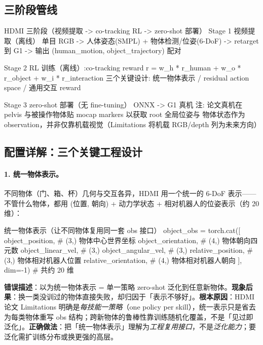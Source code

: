 \subsection{三阶段管线}
\label{sec:rlmc-mm-hdmi-pipeline}

\begin{codebox}{HDMI 三阶段（视频提取 -> co-tracking RL -> zero-shot 部署）}
Stage 1 视频提取（离线）
  单目 RGB -> 人体姿态(SMPL) + 物体检测/位姿(6-DoF) -> retarget 到 G1
  -> 输出 (human_motion, object_trajectory) 配对

Stage 2 RL 训练（离线）:co-tracking reward
  r = w_h * r_human + w_o * r_object + w_i * r_interaction
  三个关键设计: 统一物体表示 / residual action space / 通用交互 reward

Stage 3 zero-shot 部署（无 fine-tuning）
  ONNX -> G1 真机
  注: 论文真机在 pelvis 与被操作物体贴 mocap markers 以获取 root 全局位姿与
      物体状态作为 observation，并非仅靠机载视觉（Limitations 将机载 RGB/depth 列为未来方向）
\end{codebox}

\subsection{配置详解：三个关键工程设计}
\label{sec:rlmc-mm-hdmi-design}

\paragraph{1. 统一物体表示。}不同物体（门、箱、杯）几何与交互各异，HDMI 用一个统一的 6-DoF 表示——不管什么物体，都用 (位置, 朝向) + 动力学状态 + 相对机器人的位姿表示（约 20 维）：

\begin{codebox}[Python]{统一物体表示（让不同物体复用同一套 obs 接口）}
object_obs = torch.cat([
    object_position,       # (3,) 物体中心世界坐标
    object_orientation,    # (4,) 物体朝向四元数
    object_linear_vel,     # (3,)
    object_angular_vel,    # (3,)
    relative_position,     # (3,) 物体相对机器人位置
    relative_orientation,  # (4,) 物体相对机器人朝向
], dim=-1)                 # 共约 20 维
\end{codebox}

\begin{pitfall}
\textbf{错误描述}：以为统一物体表示 = 单一策略 zero-shot 泛化到任意新物体。\textbf{现象后果}：换一类没训过的物体直接失败，却归因于「表示不够好」。\textbf{根本原因}：HDMI 论文 Limitations 明确是\emph{每技能一策略}（one policy per skill），统一表示只是省去为每类物体重写 obs 结构；跨新物体的鲁棒性靠训练随机化覆盖，不是「见过即泛化」。\textbf{正确做法}：把「统一物体表示」理解为\emph{工程复用接口}，不是\emph{泛化能力}；要泛化需扩训练分布或换更强的高层。
\end{pitfall}

